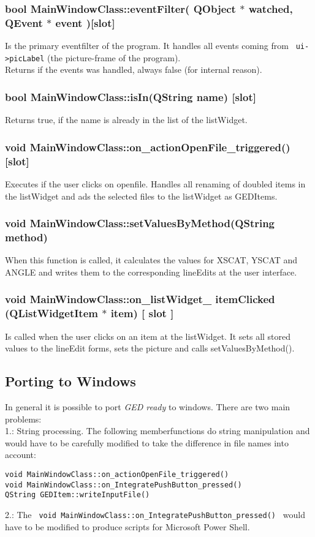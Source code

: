 \subsubsection{bool MainWindowClass::eventFilter( QObject $\ast$ watched, QEvent  $\ast$ event )[slot]}
Is the primary eventfilter of the program. It handles all events coming from \lstinline$ ui->picLabel$ (the picture-frame of the program). \\
Returns if the events was handled, always false (for internal reason). 

\subsubsection{bool MainWindowClass::isIn(QString name)  [slot]  } 
Returns true, if the name is already in the list of the listWidget. 

\subsubsection{ void MainWindowClass::on\_actionOpenFile\_triggered()  [slot] }
Executes if the user clicks on openfile. Handles all renaming of doubled items in the listWidget and ads the selected files to the listWidget as GEDItems. 

\subsubsection{void MainWindowClass::setValuesByMethod(QString method) }
When this function is called, it calculates the values for XSCAT, YSCAT and ANGLE and writes them to the corresponding lineEdits at the user interface.  

\subsubsection{void MainWindowClass::on\_listWidget\_ itemClicked (QListWidgetItem  $\ast$ item) [ slot ] }
Is called when the user clicks on an item at the listWidget. It sets all stored values to the lineEdit forms, sets the picture and calls  setValuesByMethod(). 

\subsection{Porting to Windows} 
In general it is possible to port \textit{GED ready} to windows. There are two main problems: \\
1.: String processing. The following memberfunctions do string manipulation and would have to be carefully modified to take the difference in file names into account: 
\begin{lstlisting}
void MainWindowClass::on_actionOpenFile_triggered()
void MainWindowClass::on_IntegratePushButton_pressed()
QString GEDItem::writeInputFile() 
\end{lstlisting}
2.: The \lstinline! void MainWindowClass::on_IntegratePushButton_pressed() ! would have to be modified to produce scripts for Microsoft Power Shell. 






